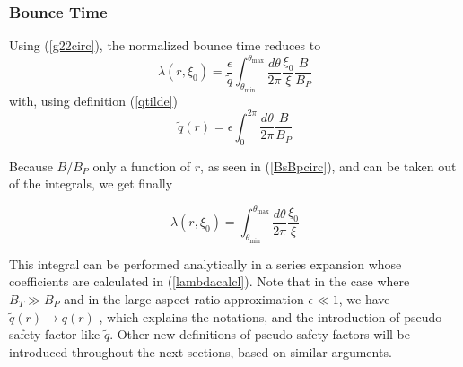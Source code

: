 \subsubsection{Bounce Time}

Using (\ref{g22circ}), the normalized bounce time reduces to
\begin{equation}
\lambda \left( r,\xi _{0}\right) =\frac{\epsilon }{\widetilde{q}}%
\int_{\theta _{\min }}^{\theta _{\max }}\frac{d\theta }{2\pi }\frac{\xi _{0}%
}{\xi }\frac{B}{B_{P}}
\end{equation}
with, using definition (\ref{qtilde})
\begin{equation}
\widetilde{q}\left( r\right) =\epsilon \int_{0}^{2\pi }\frac{d\theta }{2\pi }%
\frac{B}{B_{P}}  \label{qtilde2}
\end{equation}

Because $B/B_{P}$ only a function of $r$, as seen in (\ref{BsBpcirc}), and
can be taken out of the integrals, we get finally

\begin{equation}
\lambda \left( r,\xi _{0}\right) =\int_{\theta _{\min }}^{\theta _{\max }}%
\frac{d\theta }{2\pi }\frac{\xi _{0}}{\xi }  \label{lambdacirc}
\end{equation}

This integral can be performed analytically in a series expansion whose
coefficients are calculated in (\ref{lambdacalcl}). Note that in the case
where $B_{T}\gg B_{P}$ and in the large aspect ratio approximation $\epsilon
\ll 1$, we have $\widetilde{q}\left( r\right) \rightarrow q\left( r\right) $%
, which explains the notations, and the introduction of pseudo safety factor
like $\widetilde{q}.$ Other new definitions of pseudo safety factors will be
introduced throughout the next sections, based on similar arguments.
